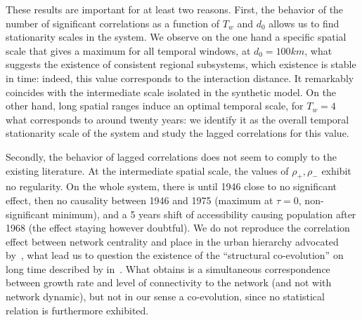 These results are important for at least two reasons. First, the behavior of the number of significant correlations as a function of $T_w$ and $d_0$ allows us to find stationarity scales in the system. We observe on the one hand a specific spatial scale that gives a maximum for all temporal windows, at $d_0 = 100km$, what suggests the existence of consistent regional subsystems, which existence is stable in time: indeed, this value corresponds to the interaction distance. It remarkably coincides with the intermediate scale isolated in the synthetic model. On the other hand, long spatial ranges induce an optimal temporal scale, for $T_w = 4$ what corresponds to around twenty years: we identify it as the overall temporal stationarity scale of the system and study the lagged correlations for this value.



Secondly, the behavior of lagged correlations does not seem to comply to the existing literature. At the intermediate spatial scale, the values of $\rho_+,\rho_-$ exhibit no regularity. On the whole system, there is until 1946 close to no significant effect, then no causality between 1946 and 1975 (maximum at $\tau = 0$, non-significant minimum), and a 5 years shift of accessibility causing population after 1968 (the effect staying however doubtful). We do not reproduce the correlation effect between network centrality and place in the urban hierarchy advocated by~\cite{bretagnolle2003vitesse}, what lead us to question the existence of the ``structural co-evolution'' on long time described by  in~\citep{espacegeo2014effets}. What \cite{bretagnolle2003vitesse} obtains is a simultaneous correspondence between growth rate and level of connectivity to the network (and not with network dynamic), but not in our sense a co-evolution, since no statistical relation is furthermore exhibited.



